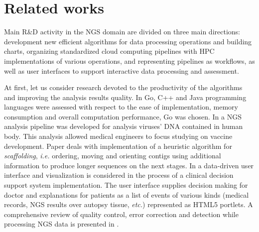 \documentclass[a4paper]{jpconf}
\begin{document}
\section{Related works}
\label{sec:relworks}

Main R\&D activity in the NGS domain are divided on three main directions: development new efficient algorithms for data processing operations and building charts, organizing standardized cloud computing pipelines with HPC implementations of various operations, and representing pipelines as workflows, as well as user interfaces to support interactive data processing and assessment.

At first, let us consider research devoted to the productivity of the algorithms and improving the analysis results quality.  In \cite{const19} Go, C++ and Java programming languages were assessed with respect to the ease of implementation, memory consumption and overall computation performance, Go was chosen. %
In \cite{Gong16} a NGS analysis pipeline was developed for analysis viruses' DNA contained in human body. This analysis allowed medical engineers to focus studying on vaccine development. %
Paper \cite{grass12} deals with implementation of a heuristic algorithm for \emph{scaffolding}, \emph{i.e.} ordering, moving and orienting contigs using additional information to produce longer sequences on the next stages.
In \cite{muller16} a data-driven user interface and visualization is considered in the process of a clinical decision support system implementation. The user interface supplies decision making for doctor and explanations for patients as a list of events of various kinds (medical records, NGS results over autopsy tissue, \emph{etc.}) represented as HTML5 portlets. A comprehensive review of quality control, error correction and detection while processing NGS data is presented in \cite{te16}. %
\end{document}
